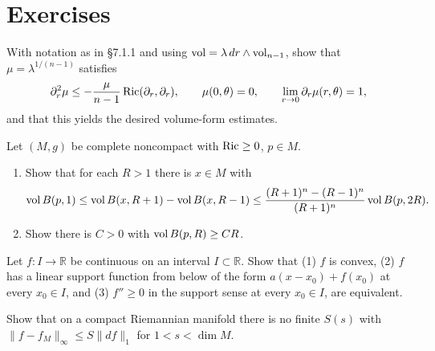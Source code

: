 \section{Exercises}

\begin{remark}
  \label{rem:pet-ch7-ex-1}

  With notation as in §7.1.1 and using $\operatorname{vol}=\lambda\,dr\wedge\operatorname{vol}_{n-1}$, show
  that $\mu=\lambda^{1/(n-1)}$ satisfies
  \[
    \partial_r^2\mu\le-\frac{\mu}{n-1}\operatorname{Ric}(\partial_r,\partial_r),\qquad
    \mu(0,\theta)=0,\qquad \lim_{r\to0}\partial_r\mu(r,\theta)=1,
  \]
  and that this yields the desired volume-form estimates.
\end{remark}

\begin{remark}
  \label{rem:pet-ch7-ex-2}

  Let $(M,g)$ be complete noncompact with $\operatorname{Ric}\ge0$, $p\in M$.
  \begin{enumerate}
    \item[(1)] Show that for each $R>1$ there is $x\in M$ with
    \[
      \operatorname{vol} B(p,1)\le\operatorname{vol} B(x,R+1)-\operatorname{vol} B(x,R-1)
      \le\frac{(R+1)^n-(R-1)^n}{(R+1)^n}\operatorname{vol} B(p,2R).
    \]
    \item[(2)] Show there is $C>0$ with $\operatorname{vol} B(p,R)\ge CR$.
  \end{enumerate}
\end{remark}

\begin{remark}
  \label{rem:pet-ch7-ex-3}

  Let $f:I\to\mathbb{R}$ be continuous on an interval $I\subset\mathbb{R}$. Show that (1)
  $f$ is convex, (2) $f$ has a linear support function from below of the form
  $a(x-x_0)+f(x_0)$ at every $x_0\in I$, and (3) $f''\ge0$ in the support
  sense at every $x_0\in I$, are equivalent.
\end{remark}

\begin{remark}
  \label{rem:pet-ch7-ex-4}

  Show that on a compact Riemannian manifold there is no finite $S(s)$ with
  $\|f-f_M\|_\infty\le S\|df\|_1$ for $1<s<\dim M$.
\end{remark}

